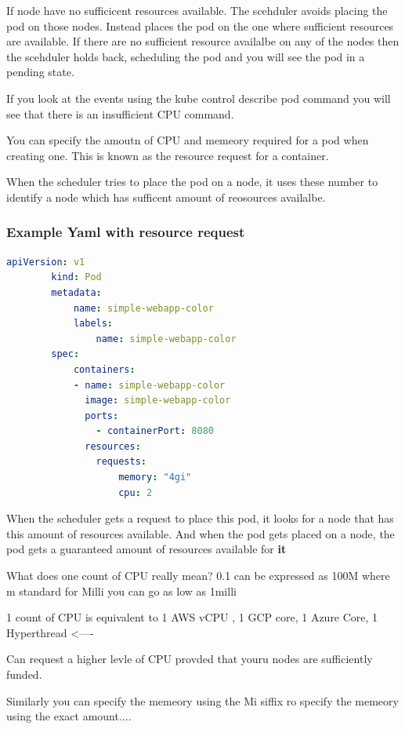 \documentclass[11pt]{book}
\begin{document}
    If node have no sufficicent resources available. The scehduler avoids placing the pod on those nodes.
    Instead places the pod on the one where sufficient resources are available.
    If there are no sufficient resource availalbe on any of the nodes then the scehduler holds back, scheduling the pod and you will see the pod in a pending state.

    If you look at the events using the kube control describe pod command you will see that there is an insufficient CPU command.

    You can specify the amoutn of CPU and memeory required for a pod when creating one.
    This is known as the resource request for a container.

    When the scheduler tries to place the pod on a node, it uses these number to identify a node which has sufficent amount of reosources availalbe.

    \subsubsection{Example Yaml with resource request}
    \begin{lstlisting}[language=yaml, caption={pod-definition.yaml}]
        apiVersion: v1
        kind: Pod
        metadata:
            name: simple-webapp-color
            labels:
                name: simple-webapp-color
        spec:
            containers:
            - name: simple-webapp-color
              image: simple-webapp-color
              ports:
                - containerPort: 8080
              resources:
                requests:
                    memory: "4gi"
                    cpu: 2
    \end{lstlisting}

    When the scheduler gets a request to place this pod, it looks for a node that has this amount of resources available.
    And when the pod gets placed on a node, the pod gets a guaranteed amount of resources available for \textbf{it}

    What does one count of CPU really mean?
    0.1 can be expressed as 100M where m standard for Milli
    you can go as low as 1milli

    1 count of CPU is equivalent to 1 AWS vCPU , 1 GCP core, 1 Azure Core, 1 Hyperthread <----

    Can request a higher levle of CPU provded that youru nodes are sufficiently funded.

    Similarly you can specify the memeory using the Mi siffix ro specify the memeory using the exact amount....
\end{document}
